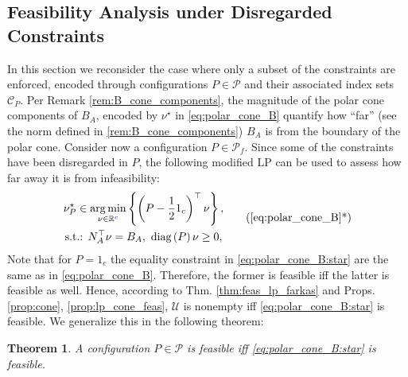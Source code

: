 \documentclass[letterpaper, 10 pt, conference]{ieeeconf}  %
\newtheorem{theorem}{\textbf{Theorem}}
\begin{document}
\subsection{Feasibility Analysis under Disregarded Constraints}
In this section we reconsider the case where only a subset of the constraints are enforced, encoded through configurations $P\in\mathcal{P}$ and their associated index sets $\mathcal{C}_P$.
Per Remark \ref{rem:B_cone_components}, the magnitude of the polar cone components of $B_A$, encoded by $\nu^\star$ in \eqref{eq:polar_cone_B} quantify how ``far'' (see the norm defined in \ref{rem:B_cone_components}) $B_A$ is from the boundary of the polar cone. Consider now a configuration $P\in\mathcal{P}_f$. Since some of the constraints have been disregarded in $P$, the following modified LP can be used to assess how far away it is from infeasibility:
\begin{equation}\label{eq:polar_cone_B:star}
    \begin{gathered}
    \nu^\star_{P} \in \underset{\nu\in\mathbb{R}{\color{blue}^c}}{\arg\min}\left\{\left( P - \frac{1}{2}{1}_c \right)^\top \nu \right\}, \\
    \textrm{s.t.: } N_{A}^\top \nu = B_{A}, \ \textrm{diag}\left( P\right) \nu \geq 0,
    \end{gathered}   
    \tag{\ref{eq:polar_cone_B}*}
\end{equation}
Note that for $P = {1}_c$ the equality constraint in \eqref{eq:polar_cone_B:star} are the same as in \eqref{eq:polar_cone_B}. Therefore, the former is feasible iff the latter is feasible as well. Hence, according to Thm. \ref{thm:feas_lp_farkas} and Props. \ref{prop:cone}, \ref{prop:lp_cone_feas}, $\mathcal{U}$ is nonempty iff \eqref{eq:polar_cone_B:star} is feasible. We generalize this in the following theorem:
\begin{theorem}\label{thm:conf_eval}
    A configuration $P\in\mathcal{P}$ is feasible iff \eqref{eq:polar_cone_B:star} is feasible. 
\end{theorem}
\end{document}
